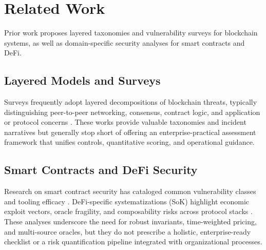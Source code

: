 \section{Related Work}
\label{sec:related_work}

Prior work proposes layered taxonomies and vulnerability surveys for blockchain systems, as well as domain-specific security analyses for smart contracts and DeFi.

\subsection*{Layered Models and Surveys}
Surveys frequently adopt layered decompositions of blockchain threats, typically distinguishing peer-to-peer networking, consensus, contract logic, and application or protocol concerns \cite{zhou2023sok, perez2021analysis}. These works provide valuable taxonomies and incident narratives but generally stop short of offering an enterprise-practical assessment framework that unifies controls, quantitative scoring, and operational guidance.

\subsection*{Smart Contracts and DeFi Security}
Research on smart contract security has cataloged common vulnerability classes and tooling efficacy \cite{perez2021analysis, praitheeshan2019systematic}. DeFi-specific systematizations (SoK) highlight economic exploit vectors, oracle fragility, and composability risks across protocol stacks \cite{zhou2023sok}. These analyses underscore the need for robust invariants, time-weighted pricing, and multi-source oracles, but they do not prescribe a holistic, enterprise-ready checklist or a risk quantification pipeline integrated with organizational processes.

